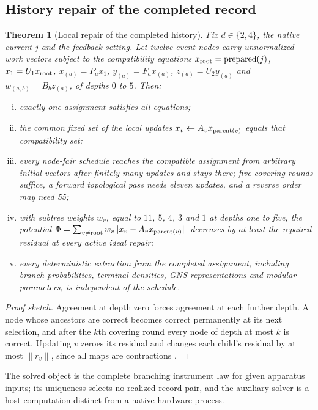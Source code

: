 \documentclass[11pt]{article}
\newtheorem{theorem}{Theorem}[section]
\theoremstyle{definition}
\theoremstyle{remark}
\theoremstyle{plain}
\begin{document}
\subsection{History repair of the completed record}
\label{sec:history-repair}

\begin{theorem}[Local repair of the completed history]
\label{thm:history}
Fix $d\in\{2,4\}$, the native current $j$ and the feedback setting. Let twelve
event nodes carry unnormalized work vectors subject to the compatibility
equations $x_{\rm root}={\rm prepared}(j)$, $x_1=U_1x_{\rm root}$,
$x_{(a)}=P_ax_1$, $y_{(a)}=F_ax_{(a)}$, $z_{(a)}=U_2y_{(a)}$ and
$w_{(a,b)}=B_bz_{(a)}$, of depths $0$ to $5$. Then:
\begin{enumerate}[(i)]
\item exactly one assignment satisfies all equations;
\item the common fixed set of the local updates
$x_v\leftarrow A_vx_{{\rm parent}(v)}$ equals that compatibility set;
\item every node-fair schedule reaches the compatible assignment from
arbitrary initial vectors after finitely many updates and stays there; five
covering rounds suffice, a forward topological pass needs eleven updates, and
a reverse order may need 55;
\item with subtree weights $w_v$, equal to $11$, $5$, $4$, $3$ and $1$ at
depths one to five, the potential
$\Phi=\sum_{v\neq{\rm root}}w_v\lVert x_v-A_vx_{{\rm parent}(v)}\rVert$
decreases by at least the repaired residual at every active ideal repair;
\item every deterministic extraction from the completed assignment, including
branch probabilities, terminal densities, GNS representations and modular
parameters, is independent of the schedule.
\end{enumerate}
\end{theorem}

\begin{proof}[Proof sketch]
Agreement at depth zero forces agreement at each further depth. A node whose
ancestors are correct becomes correct permanently at its next selection, and
after the $k$th covering round every node of depth at most $k$ is correct.
Updating $v$ zeroes its residual and changes each child's residual by at
most $\lVert r_v\rVert$, since all maps are contractions \cite{csHIST}.
\end{proof}

The solved object is the complete branching instrument law for given
apparatus inputs; its uniqueness selects no realized record pair, and the
auxiliary solver is a host computation distinct from a native hardware
process.
\end{document}
